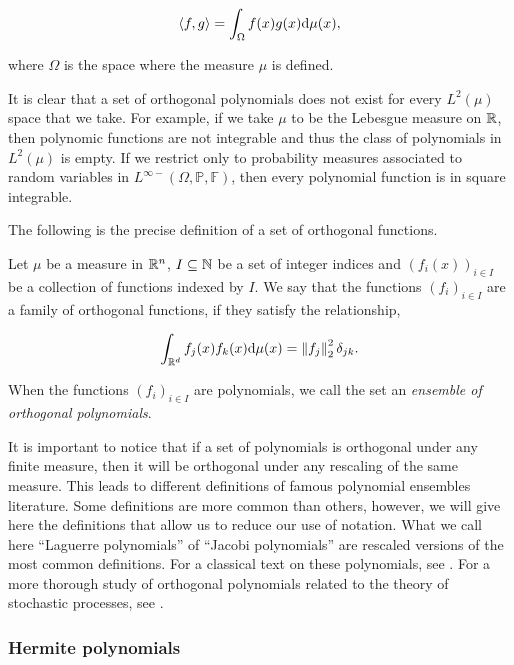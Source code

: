 \begin{equation*}
    \langle f,g\rangle = \int_\Omega f(x)g(x) \mathrm d \mu(x),
\end{equation*}

\noindent where $\Omega$ is the space where the measure $\mu$ is defined. 

It is clear that a set of orthogonal polynomials does not exist for every $L^2(\mu)$ space that we take. For example, if we take $\mu$ to be the Lebesgue measure on $\mathbb R$, then polynomic functions are not integrable and thus the class of polynomials in $L^2(\mu)$ is empty. If we restrict only to probability measures associated to random variables in $L^{\infty-}(\Omega,\mathbb P, \mathbb F)$, then every polynomial function is in square integrable.

The following is the precise definition of a set of orthogonal functions.

\begin{definition}
    Let $\mu$ be a measure in $\mathbb R^n$, $I\subseteq \mathbb N$ be a set of integer indices and $(f_i(x))_{i\in I}$ be a collection of functions indexed by $I$. We say that the functions $(f_i)_{i\in I}$ are a family of orthogonal functions, if they satisfy the relationship,

    \begin{equation*}
        \int_{\mathbb R^d} f_j(x)f_k(x) \mathrm d \mu(x) = \left\lVert f_j\right\rVert_2^2 \delta_{jk}.
    \end{equation*}
\end{definition}

When the functions $(f_i)_{i\in I}$ are polynomials, we call the set an \emph{ensemble of orthogonal polynomials}.

It is important to notice that if a set of polynomials is orthogonal under any finite measure, then it will be orthogonal under any rescaling of the same measure. This leads to different definitions of famous polynomial ensembles literature. Some definitions are more common than others, however, we will give here the definitions that allow us to reduce our use of notation. What we call here ``Laguerre polynomials'' of ``Jacobi polynomials'' are rescaled versions of the most common definitions. For a classical text on these polynomials, see \cite{szeg1939orthogonal}. For a more thorough study of orthogonal polynomials related to the theory of stochastic processes, see \cite{book:orthogonal_polynomials_and_stochastic_processes}.

\subsubsection{Hermite polynomials}

